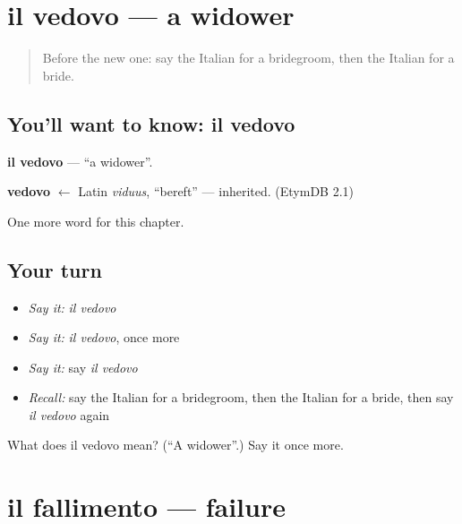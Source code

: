 \section[il vedovo]{il vedovo — a widower}

\label{lesson:IT-C164-vedovo}



\begin{quote}
Before the new one: say the Italian for a bridegroom, then the Italian for a bride.
\end{quote}

\subsection*{You'll want to know: il vedovo}
\textbf{il vedovo} — \textquotedblleft{}a widower\textquotedblright{}.

\begin{cousinweb}
\textbf{vedovo} $\leftarrow$ Latin \emph{viduus}, \textquotedblleft{}bereft\textquotedblright{} — inherited. (EtymDB 2.1)
\end{cousinweb}

\begin{grammarlens}[title={What you've built}]
One more word for this chapter.
\end{grammarlens}

\subsection*{Your turn}
\begin{itemize}
\raggedright
  \item \emph{Say it:} \emph{il vedovo}
  \item \emph{Say it:} \emph{il vedovo}, once more
  \item \emph{Say it:} say \emph{il vedovo}
  \item \emph{Recall:} say the Italian for a bridegroom, then the Italian for a bride, then say \emph{il vedovo} again
\end{itemize}

\begin{tcolorbox}[breakable,colback=teal!4,colframe=teal!35!black,title={Before you move on}]
What does il vedovo mean? (\textquotedblleft{}A widower\textquotedblright{}.) Say it once more.
\end{tcolorbox}
\section[il fallimento]{il fallimento — failure}

